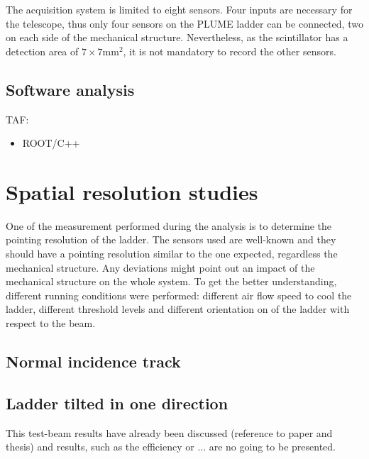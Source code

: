       The acquisition system is limited to eight sensors. 
      Four inputs are necessary for the telescope, thus only four sensors on the PLUME ladder can be connected, two on each side of the mechanical structure.
      Nevertheless, as the scintillator has a detection area of $7\times 7\text{mm}^2$, it is not mandatory to record the other sensors.

    \subsection{Software analysis}


      TAF:
      \begin{itemize}
        \item ROOT/C++
      \end{itemize}

  \section{Spatial resolution studies}
   
    One of the measurement performed during the analysis is to determine the pointing resolution of the ladder.
    The sensors used are well-known and they should have a pointing resolution similar to the one expected, regardless the mechanical structure.
    Any deviations might point out an impact of the mechanical structure on the whole system.
    To get the better understanding, different running conditions were performed: different air flow speed to cool the ladder, different threshold levels and different orientation on of the ladder with respect to the beam.

    \subsection{Normal incidence track}


    \subsection{Ladder tilted in one direction}
    
    This test-beam results have already been discussed (reference to paper and thesis) and results, such as the efficiency or ... are no going to be presented.

    \begin{figure}
    \end{figure}


